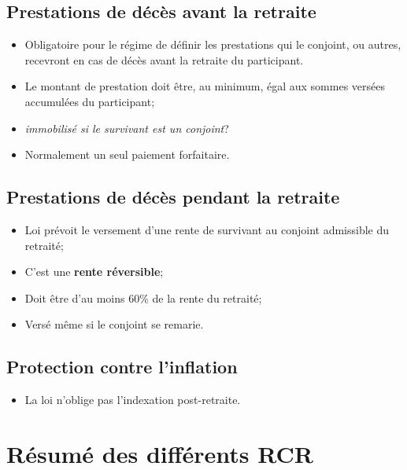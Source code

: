 \documentclass[10pt, french]{article}
\begin{document}
\begin{multicols*}{3}
\subsection*{Prestations de décès avant la retraite}
\begin{itemize}[leftmargin = *]
	\item	Obligatoire pour le régime de définir les prestations qui le conjoint, ou autres, recevront en cas de décès avant la retraite du participant.
	\item	Le montant de prestation doit être, au minimum, égal aux sommes versées accumulées du participant;
	\item	\textit{immobilisé si le survivant est un conjoint}?
	\item	Normalement un seul paiement forfaitaire.
\end{itemize}

\subsection*{Prestations de décès pendant la retraite}
\begin{itemize}[leftmargin = *]
	\item	Loi prévoit le versement d'une rente de survivant au conjoint admissible du retraité;
	\item	C'est une \textbf{rente réversible};
	\item	Doit être d'au moins 60\% de la rente du retraité;
	\item	Versé même si le conjoint se remarie.
\end{itemize}

\subsection*{Protection contre l'inflation}
\begin{itemize}[leftmargin = *]
	\item	La loi n'oblige pas l'indexation post-retraite.
\end{itemize}

\newpage

\section*{Résumé des différents RCR}


\end{multicols*}
\end{document}
